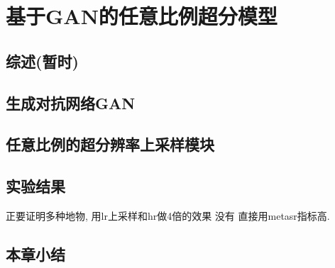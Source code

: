 \section{基于GAN的任意比例超分模型}

\subsection{综述(暂时)}
\subsection{生成对抗网络GAN}
\subsection{任意比例的超分辨率上采样模块}
\subsection{实验结果}
正要证明多种地物, 用lr上采样和hr做4倍的效果 没有 直接用metasr指标高.

\subsection{本章小结}
